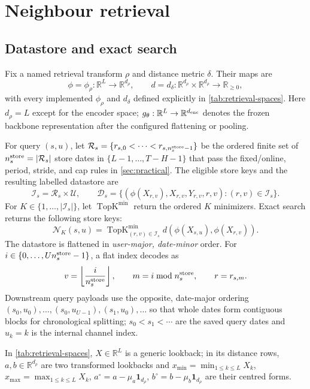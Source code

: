 \documentclass[10pt]{article}
\newcommand{\reals}{\mathbb{R}}
\newcommand{\TopK}{\operatorname{TopK}}
\begin{document}
\section{Neighbour retrieval}
\label{sec:retrieval}

\subsection{Datastore and exact search}

Fix a named retrieval transform $\rho$ and distance metric $\delta$. Their
maps are
\[
 \phi=\phi_\rho:\reals^L\to\reals^{d_\rho},
 \qquad
 d=d_\delta:\reals^{d_\rho}\times\reals^{d_\rho}\to\reals_{\geq0},
\]
with every implemented $\phi_\rho$ and $d_\delta$ defined explicitly in
\cref{tab:retrieval-spaces}. Here $d_\rho=L$ except for the encoder space;
$g_\theta:\reals^L\to\reals^{d_{\rm enc}}$ denotes the frozen backbone
representation after the configured flattening or pooling.

For query $(s,u)$, let
$\mathcal R_s=\{r_{s,0}<\cdots<r_{s,n_s^{\rm store}-1}\}$ be the ordered finite
set of $n_s^{\rm store}=|\mathcal R_s|$ store dates in
$\{L-1,\ldots,T-H-1\}$ that pass the fixed/online, period, stride, and cap
rules in \cref{sec:practical}. The eligible store keys and the resulting
labelled datastore are
\[
 \mathcal I_s=\mathcal R_s\times\mathcal U,
 \qquad
 \mathcal D_s
 =\{(\phi(X_{r,v}),X_{r,v},Y_{r,v},r,v):(r,v)\in\mathcal I_s\}.
\]
For $K\in\{1,\ldots,|\mathcal I_s|\}$, let $\TopK^{\min}$ return the ordered
$K$ minimizers. Exact search returns the following store keys:
\[
 \mathcal N_K(s,u)
 =\TopK_{(r,v)\in\mathcal I_s}^{\min}
 d\!\left(\phi(X_{s,u}),\phi(X_{r,v})\right).
\]
The datastore is flattened in \emph{user-major, date-minor} order. For
$i\in\{0,\ldots,Un_s^{\rm store}-1\}$, a flat index decodes as
\[
 v=\left\lfloor\frac{i}{n_s^{\rm store}}\right\rfloor,
 \qquad m=i\bmod n_s^{\rm store},
 \qquad r=r_{s,m}.
\]
Downstream query payloads use the opposite, date-major ordering
$(s_0,u_0),\ldots,(s_0,u_{U-1}),(s_1,u_0),\ldots$ so that whole dates form
contiguous blocks for chronological splitting; $s_0<s_1<\cdots$ are the saved
query dates and $u_k=k$ is the internal channel index.

In \cref{tab:retrieval-spaces}, $X\in\reals^L$ is a generic lookback; in its
distance rows, $a,b\in\reals^{d_\rho}$ are two transformed lookbacks and
$x_{\min}=\min_{1\leq k\leq L}X_k$,
$x_{\max}=\max_{1\leq k\leq L}X_k$,
$a^\circ=a-\mu_a\mathbf1_{d_\rho}$,
$b^\circ=b-\mu_b\mathbf1_{d_\rho}$ are their centred forms.
\end{document}
